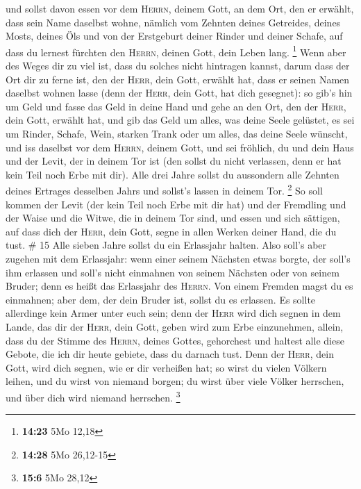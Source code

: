  und sollst davon essen vor dem \textsc{Herrn}, deinem
Gott, an dem Ort, den er erwählt, dass sein Name daselbst wohne, nämlich
vom Zehnten deines Getreides, deines Mosts, deines Öls und von der
Erstgeburt deiner Rinder und deiner Schafe, auf dass du lernest fürchten
den \textsc{Herrn}, deinen Gott, dein Leben lang. \footnote{\textbf{14:23}
  5Mo 12,18}  Wenn aber des Weges dir zu viel ist, dass
du solches nicht hintragen kannst, darum dass der Ort dir zu ferne ist,
den der \textsc{Herr}, dein Gott, erwählt hat, dass er seinen Namen
daselbst wohnen lasse (denn der \textsc{Herr}, dein Gott, hat dich
gesegnet):  so gib's hin um Geld und fasse das Geld in
deine Hand und gehe an den Ort, den der \textsc{Herr}, dein Gott,
erwählt hat,  und gib das Geld um alles, was deine Seele
gelüstet, es sei um Rinder, Schafe, Wein, starken Trank oder um alles,
das deine Seele wünscht, und iss daselbst vor dem \textsc{Herrn}, deinem
Gott, und sei fröhlich, du und dein Haus  und der Levit,
der in deinem Tor ist (den sollst du nicht verlassen, denn er hat kein
Teil noch Erbe mit dir).  Alle drei Jahre sollst du
aussondern alle Zehnten deines Ertrages desselben Jahrs und sollst's
lassen in deinem Tor. \footnote{\textbf{14:28} 5Mo 26,12-15}
 So soll kommen der Levit (der kein Teil noch Erbe mit
dir hat) und der Fremdling und der Waise und die Witwe, die in deinem
Tor sind, und essen und sich sättigen, auf dass dich der \textsc{Herr},
dein Gott, segne in allen Werken deiner Hand, die du tust. \# 15
 Alle sieben Jahre sollst du ein Erlassjahr halten.
 Also soll's aber zugehen mit dem Erlassjahr: wenn einer
seinem Nächsten etwas borgte, der soll's ihm erlassen und soll's nicht
einmahnen von seinem Nächsten oder von seinem Bruder; denn es heißt das
Erlassjahr des \textsc{Herrn}.  Von einem Fremden magst du
es einmahnen; aber dem, der dein Bruder ist, sollst du es erlassen.
 Es sollte allerdinge kein Armer unter euch sein; denn der
\textsc{Herr} wird dich segnen in dem Lande, das dir der \textsc{Herr},
dein Gott, geben wird zum Erbe einzunehmen,  allein, dass
du der Stimme des \textsc{Herrn}, deines Gottes, gehorchest und haltest
alle diese Gebote, die ich dir heute gebiete, dass du darnach tust.
 Denn der \textsc{Herr}, dein Gott, wird dich segnen, wie
er dir verheißen hat; so wirst du vielen Völkern leihen, und du wirst
von niemand borgen; du wirst über viele Völker herrschen, und über dich
wird niemand herrschen. \footnote{\textbf{15:6} 5Mo 28,12}
